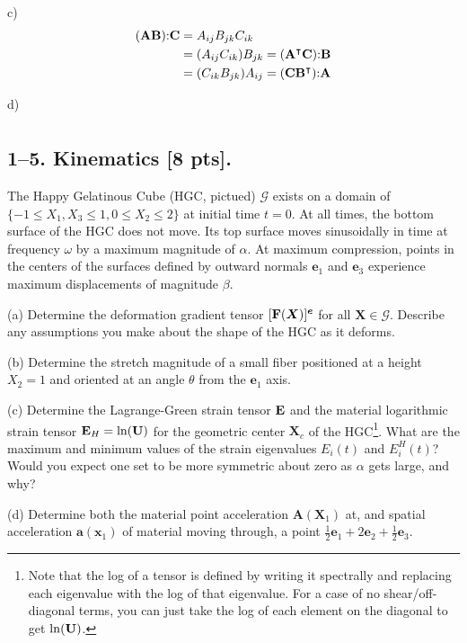 c)
\begin{align*}
    (\mathbf{A} \mathbf{B}) \mathbf{:} \mathbf{C} &=A_{ij}B_{jk}C_{ik} \\
    &= (A_{ij}C_{ik})B_{jk} = (\mathbf{A}^\intercal \mathbf{C})\mathbf{:} \mathbf{B}\\
    &=(C_{ik}B_{jk})A_{ij}= (\mathbf{C} \mathbf{B}^\intercal)\mathbf{:} \mathbf{A}
\end{align*}

d)
\begin{align*}
    
\end{align*}
\bigskip
\subsection*{1--5. \textbf{Kinematics} [8 pts].} The Happy Gelatinous Cube (HGC, pictued) $\mathcal{G}$ exists on a domain of $\{-1\leq X_1 , X_3\leq1, 0\leq X_2 \leq 2\}$ at initial time $t=0$. 
At all times, the bottom surface of the HGC does not move. 
Its top surface moves sinusoidally in time at frequency $\omega$ by a maximum magnitude of $\alpha$. 
At maximum compression, points in the centers of the surfaces defined by outward normals $\bm{e}_1$ and $\bm{e}_3$ experience maximum displacements of magnitude $\beta$. 

\medskip
(a) Determine the deformation gradient tensor $[\mathbf{F}(\bm{X})]^{\bm{e}}$ for all $\bm{X}\in \mathcal{G}$. 
Describe any assumptions you make about the shape of the HGC as it deforms. 

\medskip
(b) Determine the stretch magnitude of a small fiber positioned at a height $X_2 = 1$ and oriented at an angle $\theta$ from the $\bm{e}_1$ axis. 

\medskip
(c) Determine the Lagrange-Green strain tensor $\mathbf{E}$ and the material logarithmic strain tensor $\mathbf{E}_H = \ln (\mathbf{U})$ for the geometric center $\bm{X}_c$ of the HGC\footnote{Note that the log of a tensor is defined by writing it spectrally and replacing each eigenvalue with the log of that eigenvalue. For a case of no shear/off-diagonal terms, you can just take the log of each element on the diagonal to get $\ln(\mathbf{U})$.}. 
What are the maximum and minimum values of the strain eigenvalues $E_i(t)$ and $E_i^H(t)$? 
Would you expect one set to be more symmetric about zero as $\alpha$ gets large, and why?

\medskip
(d) Determine both the material point acceleration $\bm{A}(\bm{X}_1)$ at, and spatial acceleration $\bm{a}(\bm{x}_1)$ of material moving through, a point $\frac{1}{2} \bm{e}_1 + 2\bm{e}_2 + \frac{1}{2} \bm{e}_3$.  

\begin{figure}
\centering
{}
\end{figure}

